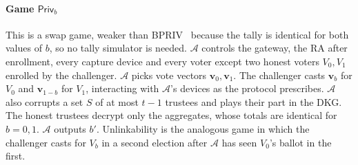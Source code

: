 \documentclass[10pt,letterpaper,journal]{IEEEtran}
\begin{document}
\paragraph{Game $\mathsf{Priv}_b$} This is a swap game, weaker than BPRIV~\cite{Bernhard2015} because the tally is identical for both values of $b$, so no tally simulator is needed. $\mathcal{A}$ controls the gateway, the RA after enrollment, every capture device and every voter except two honest voters $V_0, V_1$ enrolled by the challenger. $\mathcal{A}$ picks vote vectors $\mathbf{v}_0, \mathbf{v}_1$. The challenger casts $\mathbf{v}_b$ for $V_0$ and $\mathbf{v}_{1-b}$ for $V_1$, interacting with $\mathcal{A}$'s devices as the protocol prescribes. $\mathcal{A}$ also corrupts a set $S$ of at most $t-1$ trustees and plays their part in the DKG. The honest trustees decrypt only the aggregates, whose totals are identical for $b = 0, 1$. $\mathcal{A}$ outputs $b'$. Unlinkability is the analogous game in which the challenger casts for $V_b$ in a second election after $\mathcal{A}$ has seen $V_0$'s ballot in the first.
\end{document}
